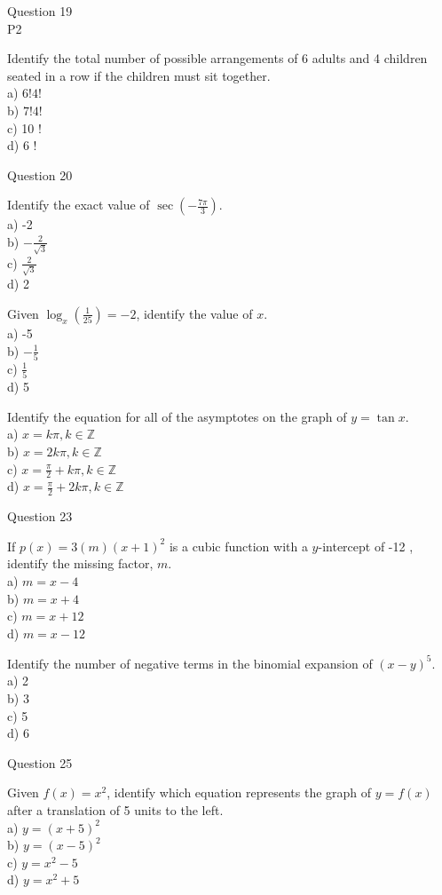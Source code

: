 \documentclass[10pt]{article}
\begin{document}
Question 19\\
P2

Identify the total number of possible arrangements of 6 adults and 4 children seated in a row if the children must sit together.\\
a) $6!4!$\\
b) $7!4!$\\
c) 10 !\\
d) 6 !

Question 20

Identify the exact value of $\sec \left(-\frac{7 \pi}{3}\right)$.\\
a) -2\\
b) $-\frac{2}{\sqrt{3}}$\\
c) $\frac{2}{\sqrt{3}}$\\
d) 2

Given $\log _{x}\left(\frac{1}{25}\right)=-2$, identify the value of $x$.\\
a) -5\\
b) $-\frac{1}{5}$\\
c) $\frac{1}{5}$\\
d) 5

Identify the equation for all of the asymptotes on the graph of $y=\tan x$.\\
a) $x=k \pi, k \in \mathbb{Z}$\\
b) $x=2 k \pi, k \in \mathbb{Z}$\\
c) $x=\frac{\pi}{2}+k \pi, k \in \mathbb{Z}$\\
d) $x=\frac{\pi}{2}+2 k \pi, k \in \mathbb{Z}$

Question 23

If $p(x)=3(m)(x+1)^{2}$ is a cubic function with a $y$-intercept of -12 , identify the missing factor, $m$.\\
a) $m=x-4$\\
b) $m=x+4$\\
c) $m=x+12$\\
d) $m=x-12$

Identify the number of negative terms in the binomial expansion of $(x-y)^{5}$.\\
a) 2\\
b) 3\\
c) 5\\
d) 6

Question 25

Given $f(x)=x^{2}$, identify which equation represents the graph of $y=f(x)$ after a translation of 5 units to the left.\\
a) $y=(x+5)^{2}$\\
b) $y=(x-5)^{2}$\\
c) $y=x^{2}-5$\\
d) $y=x^{2}+5$
\end{document}
